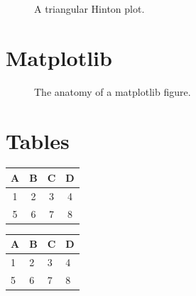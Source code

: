 \documentclass{article}%
\begin{document}
\begin{figure}[htp] 
\caption{A triangular Hinton plot.}
\end{figure}  

%
\section{Matplotlib}%
\label{sec:Matplotlib}%

\begin{figure}[htp] 
\caption{The anatomy of a matplotlib figure.}
\end{figure}  

%
\section{Tables}%
\label{sec:Tables}%
\begin{tabular}{|c|c|c|c|}%
\hline%
A&B&C&D\\%
\hline%
1&2&3&4\\%
5&6&7&8\\%
\hline%
\end{tabular}%
\newline%
\begin{tabularx}{\textwidth}{X|X|X|X}%
A&B&C&D \\ %
\hline%
1&2&3&4 \\ %
5&6&7&8 \\ %
\end{tabularx}

%
\end{document}
